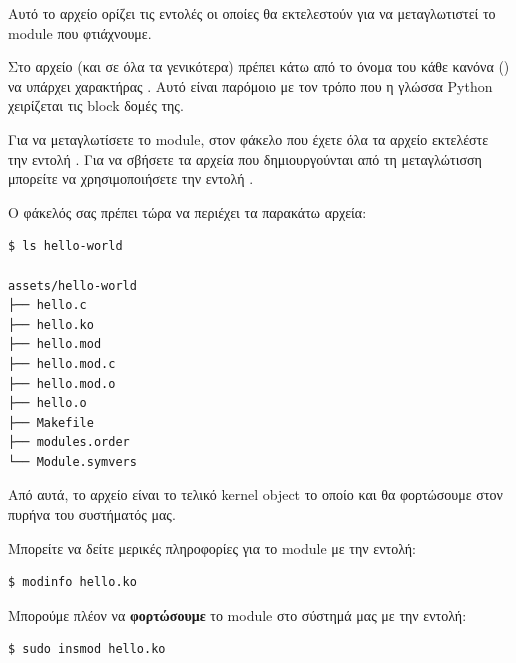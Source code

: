 \documentclass[18pt]{extarticle}
\begin{document}
Αυτό το αρχείο ορίζει τις εντολές οι οποίες θα εκτελεστούν για να μεταγλωτιστεί 
το module που φτιάχνουμε.

\begin{info}[Σημείωση:]
Στο αρχείο  (και σε όλα τα  γενικότερα) πρέπει κάτω από το όνομα του κάθε κανόνα () να υπάρχει χαρακτήρας .
Αυτό είναι παρόμοιο με τον τρόπο που η γλώσσα Python χειρίζεται τις block δομές της.
\end{info}

Για να μεταγλωτίσετε το module, στον φάκελο που έχετε όλα τα αρχείο εκτελέστε την εντολή .
Για να σβήσετε τα αρχεία που δημιουργούνται από τη μεταγλώτισση μπορείτε να χρησιμοποιήσετε την εντολή .

Ο φάκελός σας πρέπει τώρα να περιέχει τα παρακάτω αρχεία:

\begin{commandline}
\begin{verbatim}
$ ls hello-world

assets/hello-world
├── hello.c
├── hello.ko
├── hello.mod
├── hello.mod.c
├── hello.mod.o
├── hello.o
├── Makefile
├── modules.order
└── Module.symvers
\end{verbatim}
\end{commandline}


Από αυτά, το αρχείο  είναι το τελικό kernel object το οποίο και θα φορτώσουμε στον 
πυρήνα του συστήματός μας. 

Μπορείτε να δείτε μερικές πληροφορίες για το module με την εντολή: 
\begin{commandline}
\begin{verbatim}
$ modinfo hello.ko
\end{verbatim}
\end{commandline}

% 

Μπορούμε πλέον να \textbf{φορτώσουμε} το module στο σύστημά μας με την εντολή:

\begin{commandline}
\begin{verbatim}
$ sudo insmod hello.ko
\end{verbatim}
\end{commandline}
\end{document}
